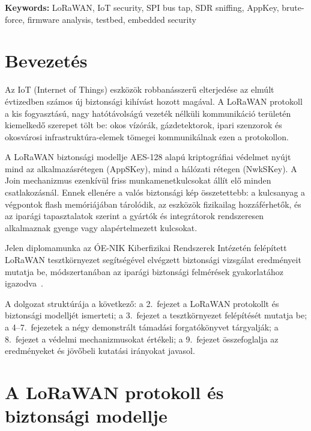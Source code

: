 \documentclass[12pt,a4paper]{article}
\begin{document}
\bigskip
\noindent\textbf{Keywords:} LoRaWAN, IoT security, SPI bus tap, SDR sniffing,
AppKey, brute-force, firmware analysis, testbed, embedded security

\newpage

\section{Bevezetés}

Az IoT (Internet of Things) eszközök robbanásszerű elterjedése az elmúlt
évtizedben számos új biztonsági kihívást hozott magával. A LoRaWAN protokoll
a kis fogyasztású, nagy hatótávolságú vezeték nélküli kommunikáció területén
kiemelkedő szerepet tölt be: okos vízórák, gázdetektorok, ipari szenzorok
és okosvárosi infrastruktúra-elemek tömegei kommunikálnak ezen a protokollon.

A LoRaWAN biztonsági modellje AES-128 alapú kriptográfiai védelmet nyújt mind
az alkalmazásrétegen (AppSKey), mind a hálózati rétegen (NwkSKey). A Join
mechanizmus ezenkívül friss munkamenetkulcsokat állít elő minden csatlakozásnál.
Ennek ellenére a valós biztonsági kép összetettebb: a kulcsanyag a végpontok
flash memóriájában tárolódik, az eszközök fizikailag hozzáférhetők, és az
iparági tapasztalatok szerint a gyártók és integrátorok rendszeresen alkalmaznak
gyenge vagy alapértelmezett kulcsokat.

Jelen diplomamunka az ÓE-NIK Kiberfizikai Rendszerek Intézetén felépített
LoRaWAN tesztkörnyezet segítségével elvégzett biztonsági vizsgálat eredményeit
mutatja be, módszertanában az iparági biztonsági felmérések
gyakorlatához igazodva~\cite{bertran2018}.

A dolgozat struktúrája a következő: a 2.\ fejezet a LoRaWAN protokollt és
biztonsági modelljét ismerteti; a 3.\ fejezet a tesztkörnyezet felépítését
mutatja be; a 4--7.\ fejezetek a négy demonstrált támadási forgatókönyvet
tárgyalják; a 8.\ fejezet a védelmi mechanizmusokat értékeli; a 9.\ fejezet
összefoglalja az eredményeket és jövőbeli kutatási irányokat javasol.

\section{A LoRaWAN protokoll és biztonsági modellje}
\end{document}
